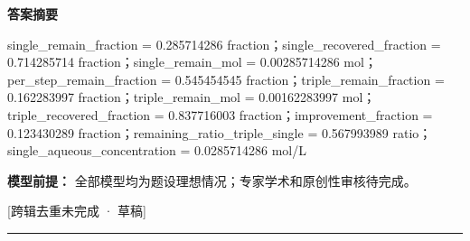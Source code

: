 \documentclass[UTF8,11pt,a4paper]{ctexart}
\begin{document}
\noindent\textbf{答案摘要}\par
single\_remain\_fraction = 0.285714286 fraction；single\_recovered\_fraction = 0.714285714 fraction；single\_remain\_mol = 0.00285714286 mol；per\_step\_remain\_fraction = 0.545454545 fraction；triple\_remain\_fraction = 0.162283997 fraction；triple\_remain\_mol = 0.00162283997 mol；triple\_recovered\_fraction = 0.837716003 fraction；improvement\_fraction = 0.123430289 fraction；remaining\_ratio\_triple\_single = 0.567993989 ratio；single\_aqueous\_concentration = 0.0285714286 mol/L\par
\noindent\textbf{模型前提：}
全部模型均为题设理想情况；专家学术和原创性审核待完成。\par
\noindent\textcolor{red!65!black}{[跨辑去重未完成 · 草稿]} \par
\medskip\hrule\medskip
{}
\end{document}
